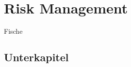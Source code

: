 
\section{Risk Management}
\label{sec:theoryA}
Fische \cite{WetterAktuellWettervorhersage}

\subsection{Unterkapitel}
\label{sec:theoryAa}

